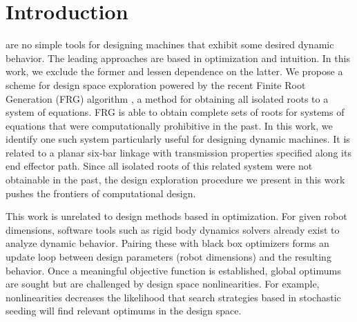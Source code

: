 \documentclass[journal]{IEEEtran}
\begin{document}
\section{Introduction}
\label{sec:intro}
% 
% 
% 
% 
 are no simple tools for designing machines that exhibit some desired dynamic behavior.
The leading approaches are based in optimization and intuition.
In this work, we exclude the former and lessen dependence on the latter.
We propose a scheme for design space exploration powered by the recent Finite Root Generation (FRG) algorithm \cite{plecnikFindingOnlyFinite2017}, a method for obtaining all isolated roots to a system of equations.
FRG is able to obtain complete sets of roots for systems of equations that were computationally prohibitive in the past.
In this work, we identify one such system particularly useful for designing dynamic machines.
It is related to a planar six-bar linkage with transmission properties specified along its end effector path.
Since all isolated roots of this related system were not obtainable in the past, the design exploration procedure we present in this work pushes the frontiers of computational design.


This work is unrelated to design methods based in optimization.
For given robot dimensions, software tools such as rigid body dynamics solvers already exist to analyze dynamic behavior.  Pairing these with black box optimizers forms an update loop between design parameters (robot dimensions) and the resulting behavior.  
Once a meaningful objective function is established, global optimums are sought but are challenged by design space nonlinearities.  
For example, nonlinearities decreases the likelihood that search strategies based in stochastic seeding will find relevant optimums in the design space.
\end{document}
